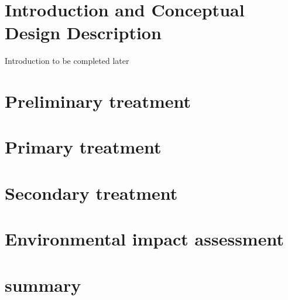 \documentclass[12pt]{article}
\begin{document}
\section{Introduction and Conceptual Design Description}
Introduction to be completed later
\newpage

\section{Preliminary treatment}
\newpage

\section{Primary treatment}
\newpage

\section{Secondary treatment}
\newpage

\section{Environmental impact assessment}
\newpage

\section{summary}
\newpage
\end{document}
